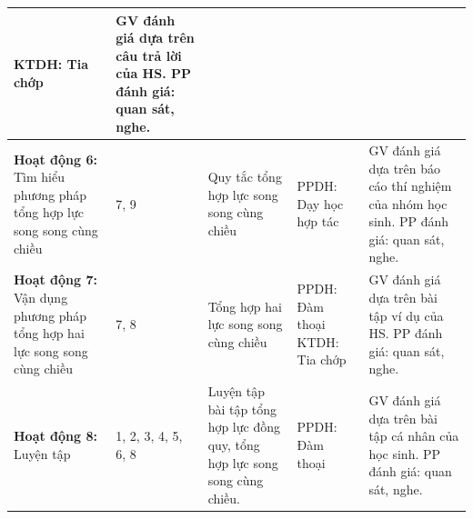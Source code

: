\begin{center}
\begin{longtable}{|L{2.75cm}|C{1.25cm}|L{5cm}|L{3.5cm}|L{4cm}|}
		KTDH: Tia chớp & GV đánh giá dựa trên câu trả lời của HS.\newline
		PP đánh giá: quan sát, nghe.  \\
		\hline
		\textbf{Hoạt động 6:} Tìm hiểu phương pháp tổng hợp lực song song cùng chiều & 7, 9 & Quy tắc tổng hợp lực song song cùng chiều  & PPDH: Dạy học hợp tác& GV đánh giá dựa trên báo cáo thí nghiệm của nhóm học sinh.\newline
		PP đánh giá: quan sát, nghe.  \\
		\hline
		\textbf{Hoạt động 7:} Vận dụng phương pháp tổng hợp hai lực song song cùng chiều & 7, 8& Tổng hợp hai lực song song cùng chiều & PPDH: Đàm thoại \newline KTDH: Tia chớp& GV đánh giá dựa trên bài tập ví dụ của HS.\newline
		PP đánh giá: quan sát, nghe.  \\
		\hline
		\textbf{Hoạt động 8:} Luyện tập	& 1, 2, 3, 4, 5, 6, 8  & Luyện tập bài tập tổng hợp lực đồng quy, tổng hợp lực song song cùng chiều. & PPDH:  Đàm thoại& GV đánh giá dựa trên bài tập cá nhân của học sinh.\newline
		PP đánh giá: quan sát, nghe. \\
		\hline
	\end{longtable}
\end{center}
